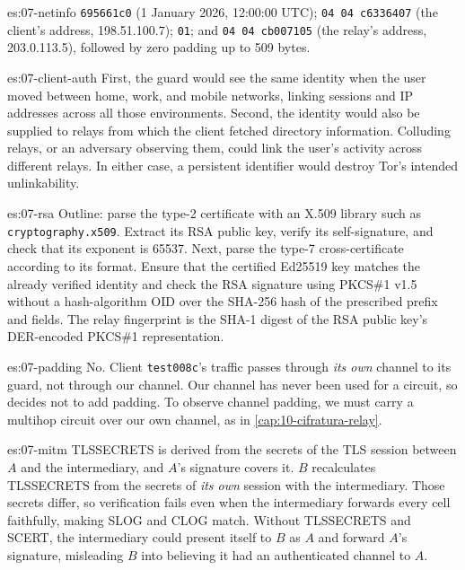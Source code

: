 \begin{soluzione}{es:07-netinfo}
\texttt{695661c0} (1 January 2026, 12:00:00 UTC); \texttt{04 04 c6336407} (the client's address, 198.51.100.7); \texttt{01}; and \texttt{04 04 cb007105} (the relay's address, 203.0.113.5), followed by zero padding up to 509 bytes.
\end{soluzione}

\begin{soluzione}{es:07-client-auth}
First, the guard would see the same identity when the user moved between home, work, and mobile networks, linking sessions and IP addresses across all those environments. Second, the identity would also be supplied to relays from which the client fetched directory information. Colluding relays, or an adversary observing them, could link the user's activity across different relays. In either case, a persistent identifier would destroy Tor's intended unlinkability.
\end{soluzione}

\begin{soluzione}{es:07-rsa}
Outline: parse the type-2 certificate with an X.509 library such as \texttt{cryptography.x509}. Extract its RSA public key, verify its self-signature, and check that its exponent is 65537. Next, parse the type-7 cross-certificate according to its format. Ensure that the certified Ed25519 key matches the already verified identity and check the RSA signature using PKCS\#1 v1.5 without a hash-algorithm OID over the SHA-256 hash of the prescribed prefix and fields. The relay fingerprint is the SHA-1 digest of the RSA public key's DER-encoded PKCS\#1 representation.
\end{soluzione}

\begin{soluzione}{es:07-padding}
No. Client \texttt{test008c}'s traffic passes through \emph{its own} channel to its guard, not through our channel. Our channel has never been used for a circuit, so  decides not to add padding. To observe channel padding, we must carry a multihop circuit over our own channel, as in \cref{cap:10-cifratura-relay}.
\end{soluzione}

\begin{soluzione}{es:07-mitm}
TLSSECRETS is derived from the secrets of the TLS session between $A$ and the intermediary, and $A$'s signature covers it. $B$ recalculates TLSSECRETS from the secrets of \emph{its own} session with the intermediary. Those secrets differ, so verification fails even when the intermediary forwards every cell faithfully, making SLOG and CLOG match. Without TLSSECRETS and SCERT, the intermediary could present itself to $B$ as $A$ and forward $A$'s signature, misleading $B$ into believing it had an authenticated channel to $A$.
\end{soluzione}


